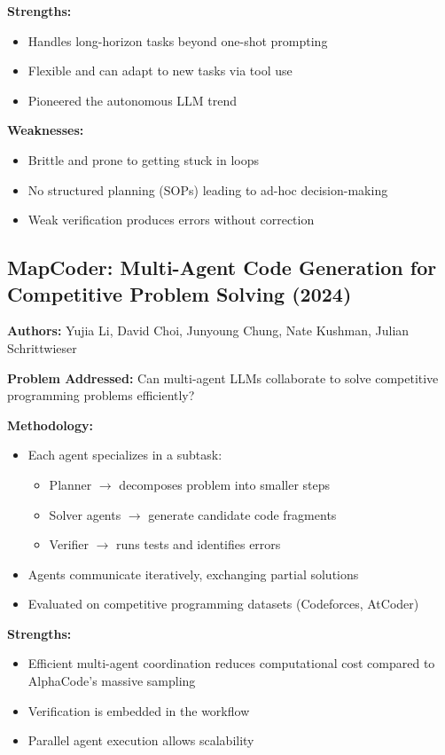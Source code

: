 \textbf{Strengths:}
\begin{itemize}
    \item Handles long-horizon tasks beyond one-shot prompting
    \item Flexible and can adapt to new tasks via tool use
    \item Pioneered the autonomous LLM trend
\end{itemize}

\textbf{Weaknesses:}
\begin{itemize}
    \item Brittle and prone to getting stuck in loops
    \item No structured planning (SOPs) leading to ad-hoc decision-making
    \item Weak verification produces errors without correction
\end{itemize}

\subsection{MapCoder: Multi-Agent Code Generation for Competitive Problem Solving (2024)}
\textbf{Authors:} Yujia Li, David Choi, Junyoung Chung, Nate Kushman, Julian Schrittwieser

\textbf{Problem Addressed:} Can multi-agent LLMs collaborate to solve competitive programming problems efficiently?

\textbf{Methodology:}
\begin{itemize}
    \item Each agent specializes in a subtask:
    \begin{itemize}
        \item Planner $\rightarrow$ decomposes problem into smaller steps
        \item Solver agents $\rightarrow$ generate candidate code fragments
        \item Verifier $\rightarrow$ runs tests and identifies errors
    \end{itemize}
    \item Agents communicate iteratively, exchanging partial solutions
    \item Evaluated on competitive programming datasets (Codeforces, AtCoder)
\end{itemize}

\textbf{Strengths:}
\begin{itemize}
    \item Efficient multi-agent coordination reduces computational cost compared to AlphaCode's massive sampling
    \item Verification is embedded in the workflow
    \item Parallel agent execution allows scalability
\end{itemize}

